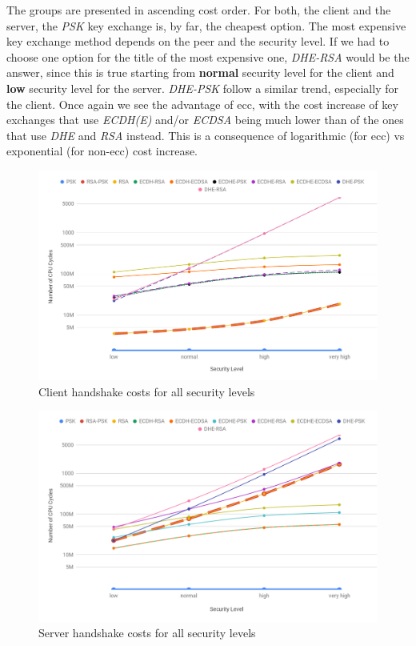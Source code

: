 The groups are presented in ascending cost order. For both, the client and the server, the \textit{PSK} key exchange is, by far,
the cheapest option. The most expensive key exchange method depends on the peer and the security level. If we had to choose one
option for the title of the most expensive one, \textit{DHE-RSA} would be the answer, since this is true starting from
\textbf{normal} security level for the client and \textbf{low} security level for the server. \textit{DHE-PSK} follow a similar trend, 
especially for the client. Once again we see the advantage of \gls{ecc}, with the cost increase of
key exchanges that use \textit{ECDH(E)} and/or \textit{ECDSA} being much lower than of the ones that use \textit{DHE} and \textit{RSA}
instead. This is a consequence of logarithmic (for \gls{ecc}) vs exponential (for non-\gls{ecc}) cost increase.

\begin{figure}
  \centering
  \includegraphics[width=1.0\textwidth]{img/client_hs_costs_all_sls.png}
  \centering \caption{\label{fig:client-hs-cost-all-sls} Client handshake costs for all security levels}
\end{figure}

\begin{figure}
  \centering
  \includegraphics[width=1.0\textwidth]{img/server_hs_costs_all_sls.png}
  \centering \caption{\label{fig:server-hs-cost-all-sls} Server handshake costs for all security levels}
\end{figure}


